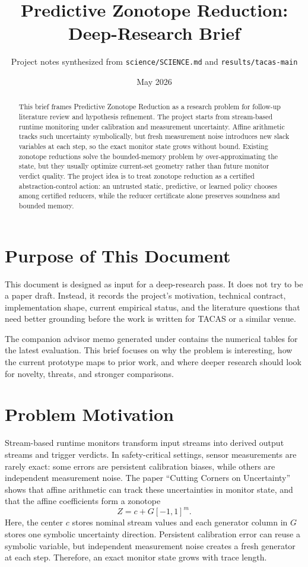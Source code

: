 \documentclass[11pt]{article}
\title{Predictive Zonotope Reduction: Deep-Research Brief}
\author{Project notes synthesized from \texttt{science/SCIENCE.md} and \texttt{results/tacas-main}}
\date{May 2026}
\newcommand{\pzr}{Predictive Zonotope Reduction}
\begin{document}
\maketitle

\begin{abstract}
This brief frames \pzr{} as a research problem for follow-up literature review
and hypothesis refinement. The project starts from stream-based runtime
monitoring under calibration and measurement uncertainty. Affine arithmetic
tracks such uncertainty symbolically, but fresh measurement noise introduces
new slack variables at each step, so the exact monitor state grows without
bound. Existing zonotope reductions solve the bounded-memory problem by
over-approximating the state, but they usually optimize current-set geometry
rather than future monitor verdict quality. The project idea is to treat
zonotope reduction as a certified abstraction-control action: an untrusted
static, predictive, or learned policy chooses among certified reducers, while
the reducer certificate alone preserves soundness and bounded memory.
\end{abstract}

\section{Purpose of This Document}

This document is designed as input for a deep-research pass. It does not try to
be a paper draft. Instead, it records the project's motivation, technical
contract, implementation shape, current empirical status, and the literature
questions that need better grounding before the work is written for TACAS or a
similar venue.

The companion advisor memo generated under
 contains the numerical tables for the
latest evaluation. This brief focuses on why the problem is interesting, how
the current prototype maps to prior work, and where deeper research should look
for novelty, threats, and stronger comparisons.

\section{Problem Motivation}

Stream-based runtime monitors transform input streams into derived output
streams and trigger verdicts. In safety-critical settings, sensor measurements
are rarely exact: some errors are persistent calibration biases, while others
are independent measurement noise. The paper ``Cutting Corners on Uncertainty''
shows that affine arithmetic can track these uncertainties in monitor state,
and that the affine coefficients form a zonotope
\[
  Z = c + G[-1,1]^m.
\]
Here, the center \(c\) stores nominal stream values and each generator column
in \(G\) stores one symbolic uncertainty direction. Persistent calibration
error can reuse a symbolic variable, but independent measurement noise creates
a fresh generator at each step. Therefore, an exact monitor state grows with
trace length.
\end{document}
